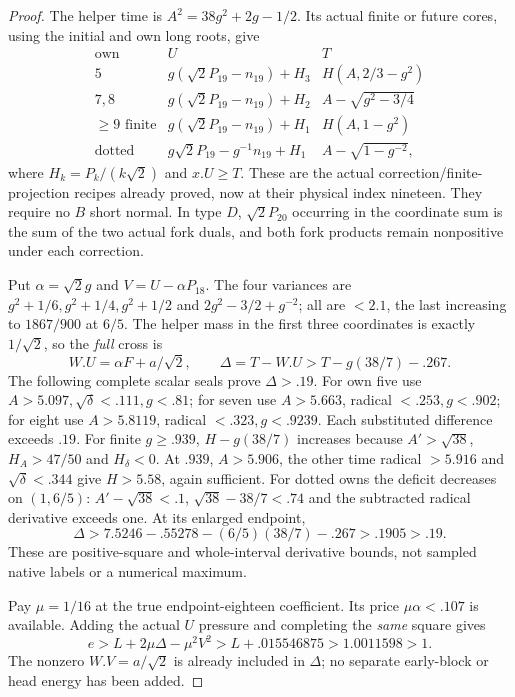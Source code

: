 \begin{proof}
The helper time is $A^2=38g^2+2g-1/2$. Its actual finite or
future cores, using the initial and own long roots, give
\[
\begin{array}{c|c|c}
\text{own}&U&T\\\hline
5&g(\sqrt2P_{19}-n_{19})+H_3&H(A,2/3-g^2)\\
7,8&g(\sqrt2P_{19}-n_{19})+H_2&A-\sqrt{g^2-3/4}\\
\ge9\text{ finite}&g(\sqrt2P_{19}-n_{19})+H_1&H(A,1-g^2)\\
\text{dotted}&g\sqrt2P_{19}-g^{-1}n_{19}+H_1&A-\sqrt{1-g^{-2}},
\end{array}
\]
where $H_k=P_k/(k\sqrt2)$ and $x.U\ge T$.
These are the actual correction/finite-projection recipes already
proved, now at their physical index nineteen. They require no $B$
short normal. In type $D$, $\sqrt2P_{20}$ occurring in the
coordinate sum is the sum of the two actual fork duals, and both
fork products remain nonpositive under each correction.

Put $\alpha=\sqrt2g$ and $V=U-\alpha P_{18}$.
The four variances are $g^2+1/6,g^2+1/4,g^2+1/2$ and
$2g^2-3/2+g^{-2}$; all are $<2.1$, the last increasing to
$1867/900$ at $6/5$. The helper mass in the first three
coordinates is exactly $1/\sqrt2$, so the \emph{full} cross is
\[
 W.U=\alpha F+a/\sqrt2,
 \qquad \Delta=T-W.U>T-g(38/7)-.267.
\]
The following complete scalar seals prove $\Delta>.19$.
For own five use $A>5.097,\sqrt\delta<.111,g<.81$;
for seven use $A>5.663$, radical $<.253,g<.902$;
for eight use $A>5.8119$, radical $<.323,g<.9239$.
Each substituted difference exceeds $.19$.
For finite $g\ge.939$, $H-g(38/7)$ increases because
$A'>\sqrt{38}$, $H_A>47/50$ and $H_\delta<0$.
At $.939$, $A>5.906$, the other time radical $>5.916$ and
$\sqrt\delta<.344$ give $H>5.58$, again sufficient.
For dotted owns the deficit decreases on $(1,6/5)$:
$A'-\sqrt{38}<.1$, $\sqrt{38}-38/7<.74$ and the subtracted
radical derivative exceeds one. At its enlarged endpoint,
\[
 \Delta>7.5246-.55278-(6/5)(38/7)-.267>.1905>.19.
\]
These are positive-square and whole-interval derivative bounds,
not sampled native labels or a numerical maximum.

Pay $\mu=1/16$ at the true endpoint-eighteen coefficient.
Its price $\mu\alpha<.107$ is available. Adding the actual $U$
pressure and completing the \emph{same} square gives
\[
 e>L+2\mu\Delta-\mu^2V^2
 >L+.015546875>1.0011598>1.
\]
The nonzero $W.V=a/\sqrt2$ is already included in $\Delta$;
no separate early-block or head energy has been added.
\end{proof}


